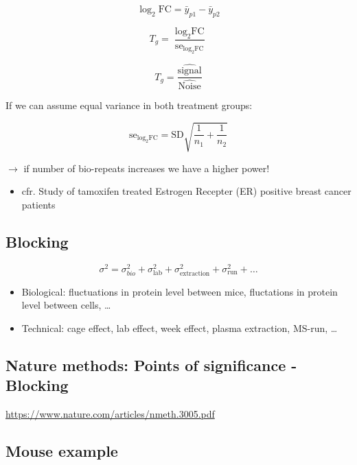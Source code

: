 \documentclass[
]{article}
\providecommand{\tightlist}{%
  \setlength{\itemsep}{0pt}\setlength{\parskip}{0pt}}
\begin{document}
\[
 \log_2 \text{FC} = \bar{y}_{p1}-\bar{y}_{p2}
\]

\[
T_g=\frac{\log_2 \text{FC}}{\text{se}_{\log_2 \text{FC}}}
\]

\[
T_g=\frac{\widehat{\text{signal}}}{\widehat{\text{Noise}}}
\]

If we can assume equal variance in both treatment groups:

\[
\text{se}_{\log_2 \text{FC}}=\text{SD}\sqrt{\frac{1}{n_1}+\frac{1}{n_2}}
\]

\(\rightarrow\) if number of bio-repeats increases we have a higher
power!

\begin{itemize}
\tightlist
\item
  cfr. Study of tamoxifen treated Estrogen Recepter (ER) positive breast
  cancer patients
\end{itemize}

\hypertarget{blocking}{%
\subsection{Blocking}\label{blocking}}

\[\sigma^2= \sigma^2_{bio}+\sigma^2_\text{lab} +\sigma^2_\text{extraction} + \sigma^2_\text{run} + \ldots\]

\begin{itemize}
\tightlist
\item
  Biological: fluctuations in protein level between mice, fluctations in
  protein level between cells, \ldots{}
\item
  Technical: cage effect, lab effect, week effect, plasma extraction,
  MS-run, \ldots{}
\end{itemize}

\hypertarget{nature-methods-points-of-significance---blocking}{%
\subsection{Nature methods: Points of significance -
Blocking}\label{nature-methods-points-of-significance---blocking}}

\url{https://www.nature.com/articles/nmeth.3005.pdf}

\hypertarget{mouse-example}{%
\subsection{Mouse example}\label{mouse-example}}
\end{document}
